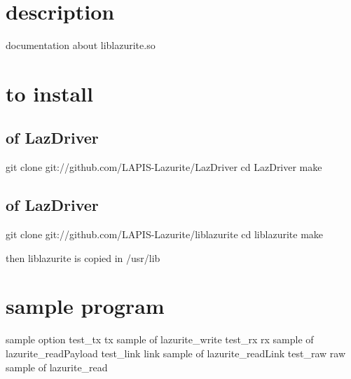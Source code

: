 \hypertarget{liblazurite_general}{}\section{description}\label{liblazurite_general}
documentation about liblazurite.\+so\hypertarget{liblazurite_how}{}\section{to install}\label{liblazurite_how}
\hypertarget{liblazurite_install}{}\subsection{of Laz\+Driver}\label{liblazurite_install}

\begin{DoxyCode}
git clone git:\textcolor{comment}{//github.com/LAPIS-Lazurite/LazDriver}
cd LazDriver
make
\end{DoxyCode}
\hypertarget{liblazurite_install}{}\subsection{of Laz\+Driver}\label{liblazurite_install}

\begin{DoxyCode}
git clone git:\textcolor{comment}{//github.com/LAPIS-Lazurite/liblazurite}
cd liblazurite
make
\end{DoxyCode}


then liblazurite is copied in /usr/lib\hypertarget{liblazurite_about}{}\section{sample program}\label{liblazurite_about}
sample option test\+\_\+tx tx sample of lazurite\+\_\+write test\+\_\+rx rx sample of lazurite\+\_\+read\+Payload test\+\_\+link link sample of lazurite\+\_\+read\+Link test\+\_\+raw raw sample of lazurite\+\_\+read 